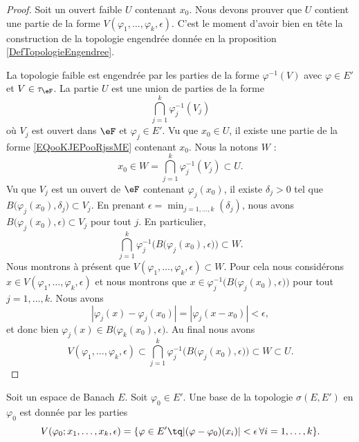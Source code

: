 \begin{proof}
	Soit un ouvert faible \( U\) contenant \( x_0\). Nous devons prouver que \( U\) contient une partie de la forme \( V(\varphi_1,\ldots, \varphi_k,\epsilon)\). C'est le moment d'avoir bien en tête la construction de la topologie engendrée donnée en la proposition \ref{DefTopologieEngendree}.

	La topologie faible est engendrée par les parties de la forme \( \varphi^{-1}(V)\) avec \( \varphi\in E'\) et \( V\in \tau_{\eF}\). La partie \( U\) est une union de parties de la forme
	\begin{equation}        \label{EQooKJEPooRjssME}
		\bigcap_{j=1}^k\varphi_j^{-1}(V_j)
	\end{equation}
	où \( V_j\) est ouvert dans \( \eF\) et \( \varphi_j\in E'\). Vu que \( x_0\in U\), il existe une partie de la forme \eqref{EQooKJEPooRjssME} contenant \( x_0\). Nous la notons \( W\) :
	\begin{equation}
		x_0\in W=\bigcap_{j=1}^k\varphi_j^{-1}(V_j)\subset U.
	\end{equation}
	Vu que \( V_j\) est un ouvert de \( \eF\) contenant \( \varphi_j(x_0)\), il existe \( \delta_j>0\) tel que \( B\big( \varphi_j(x_0),\delta_j \big)\subset V_j\). En prenant \( \epsilon=\min_{j=1,\ldots, k}(\delta_j)\), nous avons \( B\big( \varphi_j(x_0),\epsilon \big)\subset V_j\) pour tout \( j\). En particulier,
	\begin{equation}
		\bigcap_{j=1}^k\varphi_j^{-1}\Big( B\big(\varphi_j(x_0),\epsilon\big) \Big)\subset W.
	\end{equation}
	Nous montrons à présent que \( V(\varphi_1,\ldots, \varphi_k,\epsilon)\subset W\). Pour cela nous considérons \( x\in V(\varphi_1,\ldots, \varphi_k,\epsilon)\) et nous montrons que \( x\in\varphi_j^{-1}\Big( B\big( \varphi_j(x_0),\epsilon \big) \Big)\) pour tout \( j=1,\ldots, k\). Nous avons
	\begin{equation}
		| \varphi_j(x)-\varphi_j(x_0) |=| \varphi_j(x-x_0) |<\epsilon,
	\end{equation}
	et donc bien \( \varphi_j(x)\in B\big( \varphi_k(x_0),\epsilon \big)\). Au final nous avons
	\begin{equation}
		V(\varphi_1,\ldots, \varphi_k,\epsilon)\subset\bigcap_{j=1}^k\varphi_j^{-1}\Big( B\big( \varphi_j(x_0),\epsilon \big) \Big)\subset W\subset U.
	\end{equation}
\end{proof}

\begin{proposition}	\label{PROPooMBOJooQcwyuv}
	Soit un espace de Banach \( E\). Soit \( \varphi_0\in E'\). Une base de la topologie \( \sigma(E,E')\) en \( \varphi_0\) est donnée par les parties
	\begin{equation}		\label{EQooTINIooJulDll}
		V(\varphi_0;x_1,\ldots,x_k,\epsilon)=\{ \varphi\in E'\tq | (\varphi-\varphi_0)(x_i) |<\epsilon\,\forall i=1,\ldots,k \}.
	\end{equation}
\end{proposition}

